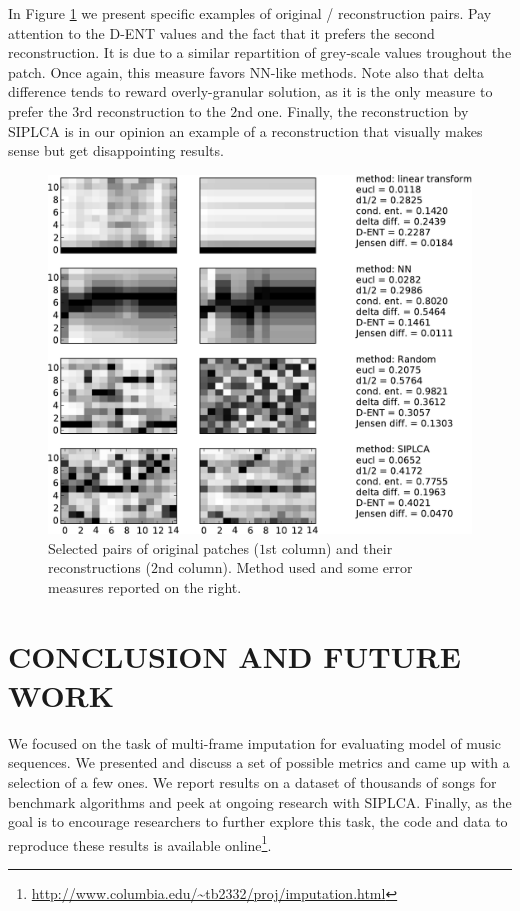 \documentclass{article}
\begin{document}
In Figure \ref{fig:origrecon} we present specific examples of original
/ reconstruction pairs. Pay attention to the D-ENT values and the fact
that it prefers the second reconstruction.  It is due to a similar
repartition of grey-scale values troughout the patch. Once again,
this measure favors NN-like methods. Note also that delta difference
tends to reward overly-granular solution, as it is the only measure to
prefer the $3$rd reconstruction to the $2$nd one. Finally, the
reconstruction by SIPLCA is in our opinion an example of a
reconstruction that visually makes sense but get disappointing results.

\begin{figure}[t]
\begin{center}
\includegraphics[width=.9\columnwidth]{original_recons}
\end{center}
\caption{Selected pairs of original patches ($1$st column)
and their reconstructions ($2$nd column). 
Method used and some error measures
reported on the right.
\label{fig:origrecon}}
\end{figure}

\section{CONCLUSION AND FUTURE WORK}
\label{sec:conclusion}
We focused on the task of multi-frame imputation for evaluating model
of music sequences. We presented and discuss a set of possible metrics
and came up with a selection of a few ones.  We report results on a
dataset of thousands of songs for benchmark algorithms and peek at
ongoing research with SIPLCA. Finally, as the goal is to encourage
researchers to further explore this task, the code and data to
reproduce these results is available
online\footnote{\scriptsize\url{http://www.columbia.edu/~tb2332/proj/imputation.html}}.
\end{document}
